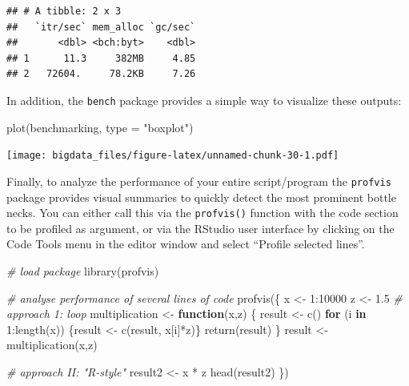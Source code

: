 \documentclass[
  12pt,
]{style/krantz}
\newenvironment{Shaded}{\begin{snugshade}}{\end{snugshade}}
\newcommand{\AttributeTok}[1]{\textcolor[rgb]{0.77,0.63,0.00}{#1}}
\newcommand{\CommentTok}[1]{\textcolor[rgb]{0.56,0.35,0.01}{\textit{#1}}}
\newcommand{\ControlFlowTok}[1]{\textcolor[rgb]{0.13,0.29,0.53}{\textbf{#1}}}
\newcommand{\DecValTok}[1]{\textcolor[rgb]{0.00,0.00,0.81}{#1}}
\newcommand{\FloatTok}[1]{\textcolor[rgb]{0.00,0.00,0.81}{#1}}
\newcommand{\FunctionTok}[1]{\textcolor[rgb]{0.00,0.00,0.00}{#1}}
\newcommand{\NormalTok}[1]{#1}
\newcommand{\OtherTok}[1]{\textcolor[rgb]{0.56,0.35,0.01}{#1}}
\newcommand{\SpecialCharTok}[1]{\textcolor[rgb]{0.00,0.00,0.00}{#1}}
\newcommand{\StringTok}[1]{\textcolor[rgb]{0.31,0.60,0.02}{#1}}
\begin{document}
\begin{verbatim}
## # A tibble: 2 x 3
##   `itr/sec` mem_alloc `gc/sec`
##       <dbl> <bch:byt>    <dbl>
## 1      11.3     382MB     4.85
## 2   72604.     78.2KB     7.26
\end{verbatim}

In addition, the \texttt{bench} package provides a simple way to visualize these outputs:

\begin{Shaded}
\begin{Highlighting}[]
\FunctionTok{plot}\NormalTok{(benchmarking, }\AttributeTok{type =} \StringTok{"boxplot"}\NormalTok{)}
\end{Highlighting}
\end{Shaded}

\texttt{[image: bigdata\_files/figure-latex/unnamed-chunk-30-1.pdf]}

Finally, to analyze the performance of your entire script/program the \texttt{profvis} package provides visual summaries to quickly detect the most prominent bottle necks. You can either call this via the \texttt{profvis()} function with the code section to be profiled as argument, or via the RStudio user interface by clicking on the Code Tools menu in the editor window and select ``Profile selected lines''.

\begin{Shaded}
\begin{Highlighting}[]
\CommentTok{\# load package}
\FunctionTok{library}\NormalTok{(profvis)}

\CommentTok{\# analyse performance of several lines of code}
\FunctionTok{profvis}\NormalTok{(\{}
\NormalTok{        x }\OtherTok{\textless{}{-}} \DecValTok{1}\SpecialCharTok{:}\DecValTok{10000}
\NormalTok{        z }\OtherTok{\textless{}{-}} \FloatTok{1.5}
        \CommentTok{\# approach 1: loop}
\NormalTok{multiplication }\OtherTok{\textless{}{-}} 
        \ControlFlowTok{function}\NormalTok{(x,z) \{}
\NormalTok{                result }\OtherTok{\textless{}{-}} \FunctionTok{c}\NormalTok{()}
                \ControlFlowTok{for}\NormalTok{ (i }\ControlFlowTok{in} \DecValTok{1}\SpecialCharTok{:}\FunctionTok{length}\NormalTok{(x)) \{result }\OtherTok{\textless{}{-}} \FunctionTok{c}\NormalTok{(result, x[i]}\SpecialCharTok{*}\NormalTok{z)\}}
                \FunctionTok{return}\NormalTok{(result)}
\NormalTok{        \}}
\NormalTok{result }\OtherTok{\textless{}{-}} \FunctionTok{multiplication}\NormalTok{(x,z)}

\CommentTok{\# approach II: "R{-}style"}
\NormalTok{result2 }\OtherTok{\textless{}{-}}\NormalTok{ x }\SpecialCharTok{*}\NormalTok{ z }
\FunctionTok{head}\NormalTok{(result2) }
\NormalTok{\})}
\end{Highlighting}
\end{Shaded}
\end{document}
